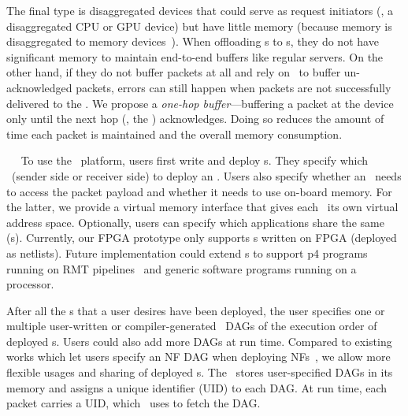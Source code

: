 The final type is disaggregated devices that could serve as request initiators (\eg, a disaggregated CPU or GPU device) but have little memory (because memory is disaggregated to memory devices~\cite{LegoOS}).
When offloading \nt{}s to \snic{}s, they do not have significant memory to maintain end-to-end buffers like regular servers.
On the other hand, if they do not buffer packets at all and rely on \snic\ to buffer un-acknowledged packets, errors can still happen when packets are not successfully delivered to the \snic. 
We propose a {\em one-hop buffer}---buffering a packet at the device only until the next hop (\ie, the \snic) acknowledges.
Doing so reduces the amount of time each packet is maintained and the overall memory consumption.
\fi

~~
To use the \snic\ platform, users first write and deploy \nt{}s.
They specify which \snic\ (sender side or receiver side) to deploy an \nt.
Users also specify whether an \nt\ needs to access the packet payload and whether it needs to use on-board memory.
For the latter, we provide a virtual memory interface that gives each \nt\ its own virtual address space.
Optionally, users can specify which applications share the same \nt{}(s).
Currently, our FPGA prototype only supports \nt{}s written on FPGA (deployed as netlists).
Future implementation could extend \snic{}s to support p4 programs running on RMT pipelines~\cite{p4fpga-sosr17} and generic software programs running on a processor.

After all the \nt{}s that a user desires have been deployed, the user specifies one or multiple user-written or compiler-generated~\cite{clicknp-sigcomm16,NFP-sigcomm17} DAGs of the execution order of deployed \nt{}s. Users could also add more DAGs at run time. Compared to existing works which let users specify an NF DAG when deploying NFs~\cite{e2-sosp15,flowtags-nsdi14,clicknp-sigcomm16}, we allow more flexible usages and sharing of deployed \nt{}s. %
The \snic\ stores user-specified DAGs in its memory and assigns a unique identifier (UID) to each DAG.
At run time, each packet carries a UID, which \snic\ uses to fetch the DAG.

